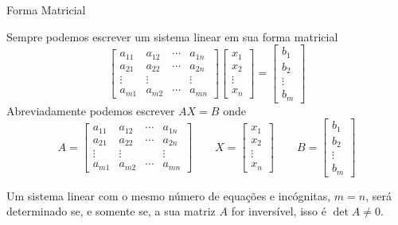 \begin{teoria}{Forma Matricial}
    
    Sempre podemos escrever um sistema linear em sua forma matricial 
    \[\left[
        \begin{array}{cccc}
            a_{11} & a_{12}  & \cdots & a_{1n} \\ 
            a_{21} & a_{22}  & \cdots & a_{2n} \\ 
            \vdots & \vdots  &        & \vdots \\
            a_{m1} & a_{m2}  & \cdots & a_{mn}
        \end{array} 
        \right]
        \left[
        \begin{array}{c} x_1 \\ x_2 \\ \vdots \\ x_n
        \end{array} 
        \right]
        =                    
        \left[
        \begin{array}{c} b_1 \\ b_2 \\ \vdots \\ b_m
        \end{array} 
        \right]
    \]    
    Abreviadamente podemos escrever $AX=B$ onde 
    \[A=\left[
        \begin{array}{cccc}
            a_{11} & a_{12}  & \cdots & a_{1n} \\ 
            a_{21} & a_{22}  & \cdots & a_{2n} \\ 
            \vdots & \vdots  &        & \vdots \\
            a_{m1} & a_{m2}  & \cdots & a_{mn}
        \end{array} 
        \right]
        \qquad X=
        \left[
        \begin{array}{c} x_1 \\ x_2 \\ \vdots \\ x_n
        \end{array} 
        \right]
        \qquad B=                    
        \left[
        \begin{array}{c} b_1 \\ b_2 \\ \vdots \\ b_m
        \end{array} 
        \right]
    \]
    
    Um sistema linear com o mesmo número de equações e incógnitas, $m=n$, será determinado
    se, e somente se, a sua matriz $A$ for inversível, isso é $\det A \neq 0$.

\end{teoria}

